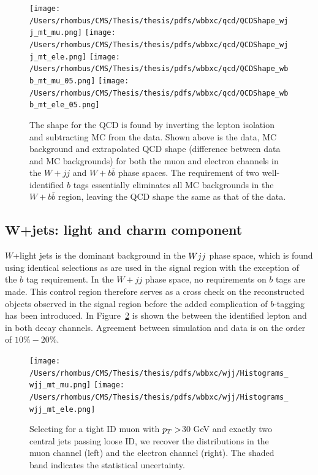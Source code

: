 \begin{figure}
 \caption[QCD shape for \wbb analysis]
 {The shape for the QCD is found by inverting the lepton
  isolation and subtracting MC from the data.
  Shown above is the data, MC background and 
   extrapolated QCD shape (difference between data
   and MC backgrounds) for both the muon and electron channels
   in the $W+jj$ and $W+b\bar{b}$ phase spaces.
  The requirement of two well-identified $b$ tags
   essentially eliminates all MC backgrounds in
   the $W+b\bar{b}$ region, leaving the QCD shape 
   the same as that of the data.
  }
 \center
\texttt{[image: /Users/rhombus/CMS/Thesis/thesis/pdfs/wbbxc/qcd/QCDShape\_wjj\_mt\_mu.png]}
\texttt{[image: /Users/rhombus/CMS/Thesis/thesis/pdfs/wbbxc/qcd/QCDShape\_wjj\_mt\_ele.png]}
\texttt{[image: /Users/rhombus/CMS/Thesis/thesis/pdfs/wbbxc/qcd/QCDShape\_wbb\_mt\_mu\_05.png]}
\texttt{[image: /Users/rhombus/CMS/Thesis/thesis/pdfs/wbbxc/qcd/QCDShape\_wbb\_mt\_ele\_05.png]}
 \label{fig:qcdshape}
\end{figure}


\subsection[$W$+jets: light and charm component]
{$\boldsymbol{W}$+jets: light and charm component}

$W$+light jets is the dominant background in the $W jj$ phase space,
 which is found using identical selections as are used in 
 the signal region with the exception of the $b$ tag requirement.
In the $W+jj$ phase space, no requirements on $b$ tags are made.
This control region therefore serves as a cross check on the 
 reconstructed objects observed in the signal region before
 the added complication of $b$-tagging has been introduced. 
In Figure~\ref{fig:wjj_plots} is shown the \mt between
 the identified lepton and \met
 in both decay channels.
Agreement between simulation and data is on the order of $10\%-20\%$.


\begin{figure}
 \caption[\wjj control region for the \wbb measurement]{
  Selecting for a tight ID muon with $p_T>$30 GeV and exactly two central jets passing loose ID,
   we recover the \mt distributions in the muon channel (left)
   and the electron channel (right). 
  The shaded band indicates the statistical uncertainty. 
 } 
\center
 \texttt{[image: /Users/rhombus/CMS/Thesis/thesis/pdfs/wbbxc/wjj/Histograms\_wjj\_mt\_mu.png]} 
 \texttt{[image: /Users/rhombus/CMS/Thesis/thesis/pdfs/wbbxc/wjj/Histograms\_wjj\_mt\_ele.png]} 
    \label{fig:wjj_plots}
\end{figure}

